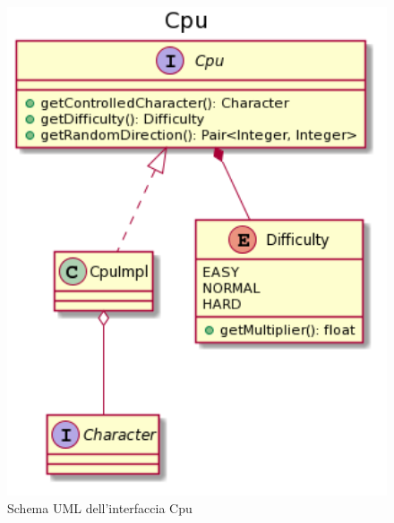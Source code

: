 \documentclass[a4paper,12pt]{report}
\begin{document}
    \begin{figure}[!t]
        \centering{}
        \includegraphics[width=150mm]{images/picchiotti/cpu.png}
        \caption{Schema UML dell'interfaccia Cpu}
        \label{img:cpu}
    \end{figure}
\end{document}
